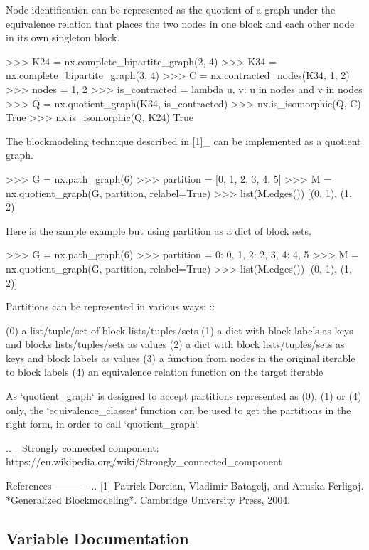 \begin{DoxyVerb}
Node identification can be represented as the quotient of a graph under the
equivalence relation that places the two nodes in one block and each other
node in its own singleton block.

>>> K24 = nx.complete_bipartite_graph(2, 4)
>>> K34 = nx.complete_bipartite_graph(3, 4)
>>> C = nx.contracted_nodes(K34, 1, 2)
>>> nodes = {1, 2}
>>> is_contracted = lambda u, v: u in nodes and v in nodes
>>> Q = nx.quotient_graph(K34, is_contracted)
>>> nx.is_isomorphic(Q, C)
True
>>> nx.is_isomorphic(Q, K24)
True

The blockmodeling technique described in [1]_ can be implemented as a
quotient graph.

>>> G = nx.path_graph(6)
>>> partition = [{0, 1}, {2, 3}, {4, 5}]
>>> M = nx.quotient_graph(G, partition, relabel=True)
>>> list(M.edges())
[(0, 1), (1, 2)]

Here is the sample example but using partition as a dict of block sets.

>>> G = nx.path_graph(6)
>>> partition = {0: {0, 1}, 2: {2, 3}, 4: {4, 5}}
>>> M = nx.quotient_graph(G, partition, relabel=True)
>>> list(M.edges())
[(0, 1), (1, 2)]

Partitions can be represented in various ways:
::

    (0) a list/tuple/set of block lists/tuples/sets
    (1) a dict with block labels as keys and blocks lists/tuples/sets as values
    (2) a dict with block lists/tuples/sets as keys and block labels as values
    (3) a function from nodes in the original iterable to block labels
    (4) an equivalence relation function on the target iterable

As `quotient_graph` is designed to accept partitions represented as (0), (1) or
(4) only, the `equivalence_classes` function can be used to get the partitions
in the right form, in order to call `quotient_graph`.

.. _Strongly connected component: https://en.wikipedia.org/wiki/Strongly_connected_component

References
----------
.. [1] Patrick Doreian, Vladimir Batagelj, and Anuska Ferligoj.
       *Generalized Blockmodeling*.
       Cambridge University Press, 2004.\end{DoxyVerb}
 

\subsection{Variable Documentation}
\mbox{\label{namespacenetworkx_1_1algorithms_1_1minors_1_1contraction_ade1bb2de987b9e078277f643fe4afac6}} 
